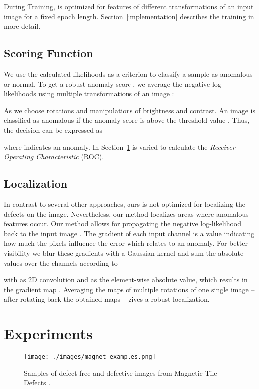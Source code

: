 \documentclass[10pt,twocolumn,letterpaper]{article}
\begin{document}
During Training,  is optimized for features  of different transformations of an input image for a fixed epoch length. Section~\ref{implementation} describes the training in more detail.


\subsection{Scoring Function}
We use the calculated likelihoods as a criterion to classify a sample as anomalous or normal.
To get a robust anomaly score , we average the negative log-likelihoods using multiple transformations  of an image :


As  we choose rotations and manipulations of brightness and contrast.
An image is classified as anomalous if the anomaly score  is above the threshold value . 
Thus, the decision can be expressed as

where  indicates an anomaly.
In Section~\ref{experiments}  is varied to calculate the \textit{Receiver Operating Characteristic} (ROC).

\subsection{Localization}
\label{loc_method}
In contrast to several other approaches, ours is not optimized for localizing the defects on the image.
Nevertheless, our method localizes areas where anomalous features occur.
Our method allows for propagating the negative log-likelihood  back to the input image .
The gradient  of each input channel  is a value indicating how much the pixels influence the error which relates to an anomaly.
For better visibility we blur these gradients with a Gaussian kernel  and sum the absolute values over the channels  according to

with  as 2D convolution and  as the element-wise absolute value, which results in the gradient map .
Averaging the maps of multiple rotations of one single image -- after rotating back the obtained maps -- gives a robust localization.


\section{Experiments}
\label{experiments}

\begin{figure}
\centering
  \texttt{[image: ./images/magnet\_examples.png]} 
 \caption{Samples of defect-free and defective images from Magnetic Tile Defects \cite{magnets}.}
\label{fig:magnet_examples}
\end{figure}
\end{document}
